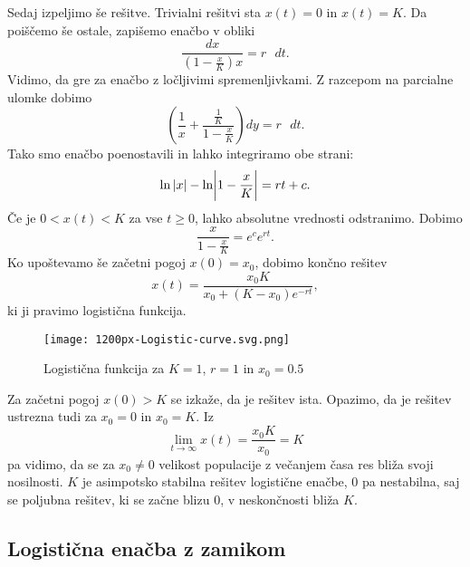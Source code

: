 \documentclass[12pt,a4paper]{amsart}
\theoremstyle{definition} %
\theoremstyle{plain} %
\begin{document}
Sedaj izpeljimo še rešitve. Trivialni rešitvi sta $x(t)=0$ in $x(t)=K$. Da poiščemo še ostale, zapišemo enačbo v obliki
\[\frac{dx}{(1-\frac{x}{K})x}=r\text{ }dt.\]
Vidimo, da gre za enačbo z ločljivimi spremenljivkami. Z razcepom na parcialne ulomke dobimo
\[\left(\frac{1}{x}+\frac{\frac{1}{K}}{1-\frac{x}{K}}\right)dy=r\text{ }dt.\]
Tako smo enačbo poenostavili in lahko integriramo obe strani:
\[\ln|x|-\ln\biggr{|}1-\frac{x}{K}\biggr{|}=rt+c.\]
Če je $0<x(t)<K$ za vse $t\geq0$, lahko absolutne vrednosti odstranimo. Dobimo 
\[\frac{x}{1-\frac{x}{K}}=e^ce^{rt}.\]
Ko upoštevamo še začetni pogoj $x(0)=x_0$, dobimo končno rešitev
\[x(t)=\frac{x_0K}{x_0+(K-x_0)e^{-rt}},\]
ki ji pravimo logistična funkcija.


\begin{figure}[h]
    \texttt{[image: 1200px-Logistic-curve.svg.png]}
    \caption{Logistična funkcija za $K=1$, $r=1$ in $x_0=0.5$}
\end{figure}

\noindent Za začetni pogoj $x(0)>K$ se izkaže, da je rešitev ista.
Opazimo, da je rešitev ustrezna tudi za $x_0=0$ in $x_0=K$. Iz 
\[\lim_{t\to\infty}x(t)=\frac{x_0K}{x_0}=K\]
pa vidimo, da se za $x_0\neq0$ velikost populacije z večanjem časa res bliža svoji nosilnosti. $K$ je asimpotsko stabilna 
rešitev logistične enačbe, 0 pa nestabilna, saj se poljubna rešitev, ki se začne blizu 0, v neskončnosti bliža $K$.

\subsection{Logistična enačba z zamikom}
\end{document}
